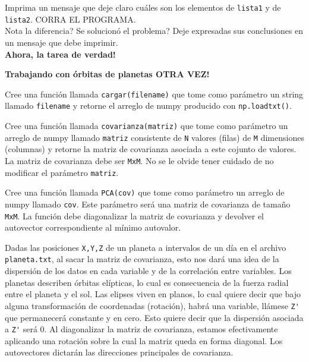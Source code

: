 \documentclass[11pt,letterpaper]{exam}
\begin{document}
\begin{questions}
Imprima un mensaje que deje claro cu\'ales son los elementos de \verb"lista1" y de \verb"lista2". CORRA EL PROGRAMA.\\

Nota la diferencia? Se solucion\'o el problema? Deje expresadas sus conclusiones en un mensaje que debe imprimir.\\

\LARGE \textbf{Ahora, la tarea de verdad!}\\

\normalsize

\textbf{Trabajando con \'orbitas de planetas OTRA VEZ!}



Cree una funci\'on llamada \verb"cargar(filename)" que tome como par\'ametro un string llamado \verb"filename" y retorne el arreglo de numpy producido con \verb"np.loadtxt()".


Cree una funci\'on llamada \verb"covarianza(matriz)" que tome como par\'ametro un arreglo de numpy llamado \verb"matriz" consistente de \verb"N" valores (filas) de \verb"M" dimensiones (columnas) y retorne la matriz de covarianza asociada a este cojunto de valores. La matriz de covarianza debe ser \verb"MxM". No se le olvide tener cuidado de no modificar el par\'ametro \verb"matriz".\\


Cree una funci\'on llamada \verb"PCA(cov)" que tome como par\'ametro un arreglo de numpy llamado \verb"cov". Este par\'ametro ser\'a una matriz de covarianza de tama\~no \verb"MxM". La funci\'on debe diagonalizar la matriz de covarianza y devolver el autovector correspondiente al m\'inimo autovalor.\\


Dadas las posiciones \verb"X,Y,Z" de un planeta a intervalos de un d\'ia en el archivo \verb"planeta.txt", al sacar la matriz de covarianza, esto nos dar\'a una idea de la dispersi\'on de los datos en cada variable y de la correlaci\'on entre variables. Los planetas describen \'orbitas el\'ipticas, lo cual es consecuencia de la fuerza radial entre el planeta y el sol. Las elipses viven en planos, lo cual quiere decir que bajo alguna transformaci\'on de coordenadas (rotaci\'on), habr\'a una variable, ll\'amese \verb"Z'" que permanecer\'a constante y en cero. Esto quiere decir que la dispersi\'on asociada a \verb"Z'" ser\'a 0. Al diagonalizar la matriz de covarianza, estamos efectivamente aplicando una rotaci\'on sobre la cual la matriz queda en forma diagonal. Los autovectores dictar\'an las direcciones principales de covarianza.\\


\end{questions}
\end{document}

